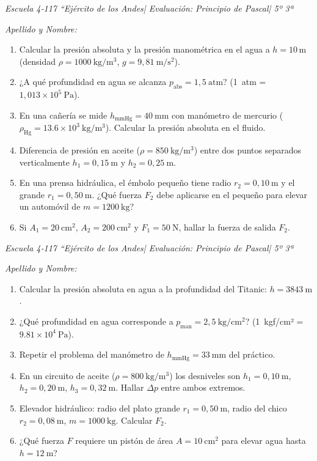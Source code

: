 \documentclass[a4paper,12pt]{article}
\begin{document}
\thispagestyle{empty}
\large
\textit{Escuela 4‑117 “Ejército de los Andes| Evaluación: Principio de Pascal| 5º 3ª }

\noindent\textit{Apellido y Nombre:} \underline{\hspace{12cm}}
\begin{enumerate}[itemsep=0pt,parsep=0pt]
  \item Calcular la presión absoluta y la presión manométrica en el agua a $h=10{\,}\mathrm m$ (densidad $\rho=1000\:\mathrm{kg/m^3}$, $g=9{,}81\:\mathrm{m/s^2}$).
  \item ¿A qué profundidad en agua se alcanza $p_\text{abs}=1{,}5\:\mathrm{atm}$? (1 atm = $1{,}013\times10^5\:\mathrm{Pa}$).
  \item En una cañería se mide $h_\text{mmHg}=40\:\mathrm{mm}$ con manómetro de mercurio ($\rho_{\mathrm{Hg}}=13.6\times10^3\:\mathrm{kg/m^3}$). Calcular la presión absoluta en el fluido.
  \item Diferencia de presión en aceite ($\rho=850\:\mathrm{kg/m^3}$) entre dos puntos separados verticalmente $h_1=0{,}15\:\mathrm m$ y $h_2=0{,}25\:\mathrm m$.
  \item En una prensa hidráulica, el émbolo pequeño tiene radio $r_2=0{,}10\:\mathrm m$ y el grande $r_1=0{,}50\:\mathrm m$. ¿Qué fuerza $F_2$ debe aplicarse en el pequeño para elevar un automóvil de $m=1200\:\mathrm{kg}$?
  \item Si $A_1=20\:\mathrm{cm^2}$, $A_2=200\:\mathrm{cm^2}$ y $F_1=50\:\mathrm N$, hallar la fuerza de salida $F_2$.
\end{enumerate}

\textit{Escuela 4‑117 “Ejército de los Andes| Evaluación: Principio de Pascal| 5º 3ª}

\noindent\textit{Apellido y Nombre:} \underline{\hspace{12cm}}
\begin{enumerate}
  \item Calcular la presión absoluta en agua a la profundidad del Titanic: $h=3843\:\mathrm m$.
  \item ¿Qué profundidad en agua corresponde a $p_\text{man}=2{,}5\:\mathrm{kg/cm^2}$? (1 kgf/cm² = $9.81\times10^4\:\mathrm{Pa}$).
  \item Repetir el problema del manómetro de $h_\text{mmHg}=33\:\mathrm{mm}$ del práctico.
  \item En un circuito de aceite ($\rho=800\:\mathrm{kg/m^3}$) los desniveles son $h_1=0{,}10\:\mathrm m$, $h_2=0{,}20\:\mathrm m$, $h_3=0{,}32\:\mathrm m$. Hallar $\Delta p$ entre ambos extremos.
  \item Elevador hidráulico: radio del plato grande $r_1=0{,}50\:\mathrm m$, radio del chico $r_2=0{,}08\:\mathrm m$, $m=1000\:\mathrm{kg}$. Calcular $F_2$.
  \item ¿Qué fuerza $F$ requiere un pistón de área $A=10\:\mathrm{cm^2}$ para elevar agua hasta $h=12\:\mathrm m$?
\end{enumerate}
\end{document}
